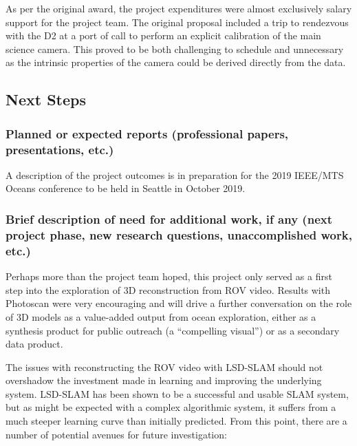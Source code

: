 \documentclass[letterpaper,12pt]{article}
\begin{document}
\vspace{12pt}
\noindent
As per the original award, the project expenditures were almost exclusively salary support for the project team.  The original proposal included a trip to rendezvous with the D2 at a port of call to perform an explicit calibration of the main science camera.  This proved to be both challenging to schedule and unnecessary as the intrinsic properties of the camera could be derived directly from the data.

\subsection{Next Steps}
\subsubsection*{Planned or expected reports (professional papers, presentations, etc.)}

A description of the project outcomes is in preparation for the 2019 IEEE/MTS Oceans conference to be held in Seattle in October 2019.

\subsubsection*{Brief description of need for additional work, if any (next project phase, new research questions, unaccomplished work, etc.)}

Perhaps more than the project team hoped, this project only served as a first step into the exploration of 3D reconstruction from ROV video.  Results with Photoscan were very encouraging and will drive a further conversation on the role of 3D models as a value-added output from ocean exploration, either as a synthesis product for public outreach (a ``compelling visual'') or as a secondary data product.     

The issues with reconstructing the ROV video with LSD-SLAM should not overshadow the investment made in learning and improving the underlying system.   LSD-SLAM has been shown to be a successful and usable SLAM system, but as might be expected with a complex algorithmic system, it suffers from a much steeper learning curve than initially predicted.   
From this point, there are a number of potential avenues for future investigation:
\end{document}
